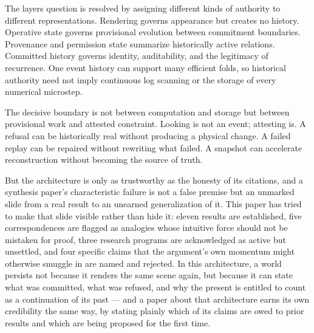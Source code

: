 \documentclass[11pt]{article}
\begin{document}
The layers question is resolved by assigning different kinds of authority to different representations. Rendering governs appearance but creates no history. Operative state governs provisional evolution between commitment boundaries. Provenance and permission state summarize historically active relations. Committed history governs identity, auditability, and the legitimacy of recurrence. One event history can support many efficient folds, so historical authority need not imply continuous log scanning or the storage of every numerical microstep.

The decisive boundary is not between computation and storage but between provisional work and attested constraint. Looking is not an event; attesting is. A refusal can be historically real without producing a physical change. A failed replay can be repaired without rewriting what failed. A snapshot can accelerate reconstruction without becoming the source of truth.

But the architecture is only as trustworthy as the honesty of its citations, and a synthesis paper's characteristic failure is not a false premise but an unmarked slide from a real result to an unearned generalization of it. This paper has tried to make that slide visible rather than hide it: eleven results are established, five correspondences are flagged as analogies whose intuitive force should not be mistaken for proof, three research programs are acknowledged as active but unsettled, and four specific claims that the argument's own momentum might otherwise smuggle in are named and rejected. In this architecture, a world persists not because it renders the same scene again, but because it can state what was committed, what was refused, and why the present is entitled to count as a continuation of its past --- and a paper about that architecture earns its own credibility the same way, by stating plainly which of its claims are owed to prior results and which are being proposed for the first time.
\end{document}
